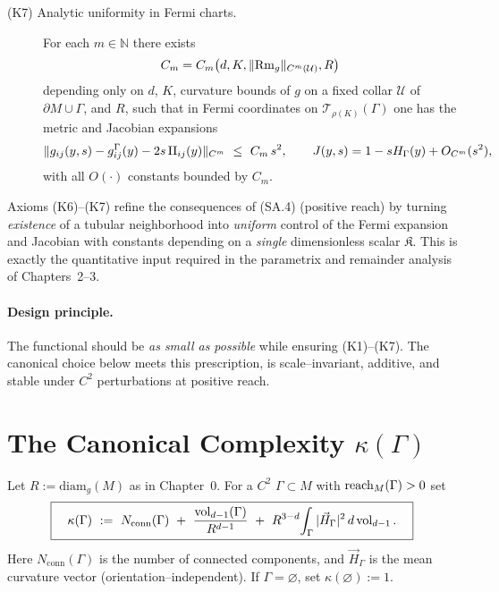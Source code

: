 \begin{description}
\item[(K7) Analytic uniformity in Fermi charts.] For each $m\in\mathbb{N}$ there exists
\[
C_m=C_m\big(d,K,\|{\rm Rm}_g\|_{C^m(\mathcal{U})},R\big)
\]
depending only on $d$, $K$, curvature bounds of $g$ on a fixed collar $\mathcal{U}$ of $\partial M\cup\Gamma$, and $R$, such that in Fermi coordinates on $\mathcal{T}_{\rho(K)}(\Gamma)$ one has the metric and Jacobian expansions
\[
\|g_{ij}(y,s)-g^\Gamma_{ij}(y)-2s\,\II_{ij}(y)\|_{C^m}\ \le\ C_m\, s^2,\qquad
J(y,s)=1-sH_\Gamma(y)+O_{C^m}(s^2),
\]
with all $O(\cdot)$ constants bounded by $C_m$.
\end{description}

\begin{remark}
Axioms (K6)–(K7) refine the consequences of (SA.4) (positive reach) by turning \emph{existence} of a tubular neighborhood into \emph{uniform} control of the Fermi expansion and Jacobian with constants depending on a \emph{single} dimensionless scalar $\mathfrak{K}$.
This is exactly the quantitative input required in the parametrix and remainder analysis of Chapters~2–3.
\end{remark}

\paragraph{Design principle.}
The functional should be \emph{as small as possible} while ensuring (K1)–(K7). The canonical choice below meets this prescription, is scale–invariant, additive, and stable under $C^2$ perturbations at positive reach.

\bigskip

\section{The Canonical Complexity \texorpdfstring{$\kappa(\Gamma)$}{kappa(Gamma)}}
\label{sec:canonical-kappa}

\begin{definition}
\label{def:canonical-kappa}
Let $R:=\mathrm{diam}_g(M)$ as in Chapter~0. For a $C^2$ $\Gamma\subset M$ with $\operatorname{reach}_M(\Gamma)>0$ set
\[
\boxed{\quad
\kappa(\Gamma)\ :=\ N_{\mathrm{conn}}(\Gamma)\ +\ \frac{\vol_{d-1}(\Gamma)}{R^{d-1}}\ +\ R^{3-d}\!\int_\Gamma |\vec H_\Gamma|^2\,d\vol_{d-1}.
\quad}
\]
Here $N_{\mathrm{conn}}(\Gamma)$ is the number of connected components, and $\vec H_\Gamma$ is the mean curvature vector (orientation–independent). If $\Gamma=\varnothing$, set $\kappa(\varnothing):=1$.
\end{definition}

